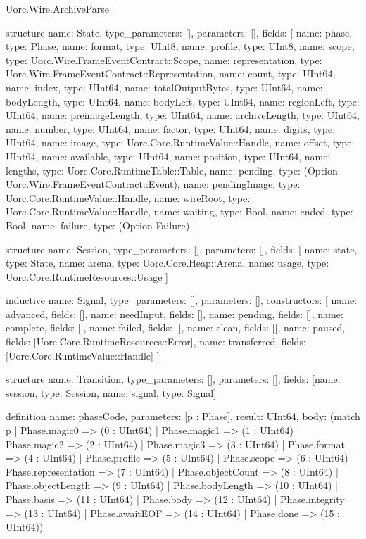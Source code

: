 \begin{lexlean}{Uorc.Wire.ArchiveParse}
\begin{semanticmodule}
structure{
  name: State,
  type_parameters: [],
  parameters: [],
  fields: [
    {name: phase, type: Phase},
    {name: format, type: UInt8},
    {name: profile, type: UInt8},
    {name: scope, type: Uorc.Wire.FrameEventContract::Scope},
    {name: representation, type: Uorc.Wire.FrameEventContract::Representation},
    {name: count, type: UInt64},
    {name: index, type: UInt64},
    {name: totalOutputBytes, type: UInt64},
    {name: bodyLength, type: UInt64},
    {name: bodyLeft, type: UInt64},
    {name: regionLeft, type: UInt64},
    {name: preimageLength, type: UInt64},
    {name: archiveLength, type: UInt64},
    {name: number, type: UInt64},
    {name: factor, type: UInt64},
    {name: digits, type: UInt64},
    {name: image, type: Uorc.Core.RuntimeValue::Handle},
    {name: offset, type: UInt64},
    {name: available, type: UInt64},
    {name: position, type: UInt64},
    {name: lengths, type: Uorc.Core.RuntimeTable::Table},
    {name: pending, type: (Option Uorc.Wire.FrameEventContract::Event)},
    {name: pendingImage, type: Uorc.Core.RuntimeValue::Handle},
    {name: wireRoot, type: Uorc.Core.RuntimeValue::Handle},
    {name: waiting, type: Bool},
    {name: ended, type: Bool},
    {name: failure, type: (Option Failure)}
  ]
}

structure{
  name: Session,
  type_parameters: [],
  parameters: [],
  fields: [
    {name: state, type: State},
    {name: arena, type: Uorc.Core.Heap::Arena},
    {name: usage, type: Uorc.Core.RuntimeResources::Usage}
  ]
}

inductive{
  name: Signal,
  type_parameters: [],
  parameters: [],
  constructors: [
    {name: advanced, fields: []},
    {name: needInput, fields: []},
    {name: pending, fields: []},
    {name: complete, fields: []},
    {name: failed, fields: []},
    {name: clean, fields: []},
    {name: paused, fields: [Uorc.Core.RuntimeResources::Error]},
    {name: transferred, fields: [Uorc.Core.RuntimeValue::Handle]}
  ]
}

structure{
  name: Transition,
  type_parameters: [],
  parameters: [],
  fields: [{name: session, type: Session}, {name: signal, type: Signal}]
}

definition{
  name: phaseCode,
  parameters: [p : Phase],
  result: UInt64,
  body: (match p
    | Phase.magic0 => (0 : UInt64)
    | Phase.magic1 => (1 : UInt64)
    | Phase.magic2 => (2 : UInt64)
    | Phase.magic3 => (3 : UInt64)
    | Phase.format => (4 : UInt64)
    | Phase.profile => (5 : UInt64)
    | Phase.scope => (6 : UInt64)
    | Phase.representation => (7 : UInt64)
    | Phase.objectCount => (8 : UInt64)
    | Phase.objectLength => (9 : UInt64)
    | Phase.bodyLength => (10 : UInt64)
    | Phase.basis => (11 : UInt64)
    | Phase.body => (12 : UInt64)
    | Phase.integrity => (13 : UInt64)
    | Phase.awaitEOF => (14 : UInt64)
    | Phase.done => (15 : UInt64))
}


\end{semanticmodule}
\end{lexlean}
